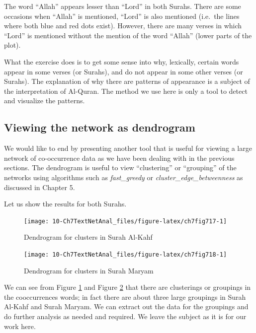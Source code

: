 \documentclass[
]{article}
\begin{document}
The word ``Allah'' appears lesser than ``Lord'' in both Surahs. There are some occasions when ``Allah'' is mentioned, ``Lord'' is also mentioned (i.e.~the lines where both blue and red dots exist). However, there are many verses in which ``Lord'' is mentioned without the mention of the word ``Allah'' (lower parts of the plot).

What the exercise does is to get some sense into why, lexically, certain words appear in some verses (or Surahs), and do not appear in some other verses (or Surahs). The explanation of why there are patterns of appearance is a subject of the interpretation of Al-Quran. The method we use here is only a tool to detect and visualize the patterns.

\hypertarget{viewing-the-network-as-dendrogram}{%
\subsection{Viewing the network as dendrogram}\label{viewing-the-network-as-dendrogram}}

We would like to end by presenting another tool that is useful for viewing a large network of co-occurrence data as we have been dealing with in the previous sections. The dendrogram is useful to view ``clustering'' or ``grouping'' of the networks using algorithms such as \emph{fast\_greedy} or \emph{cluster\_edge\_betweenness} as discussed in Chapter 5.

Let us show the results for both Surahs.

\begin{figure}

{\centering \texttt{[image: 10-Ch7TextNetAnal\_files/figure-latex/ch7fig717-1]} 

}

\caption{Dendrogram for clusters in Surah Al-Kahf}\label{fig:ch7fig717}
\end{figure}

\begin{figure}

{\centering \texttt{[image: 10-Ch7TextNetAnal\_files/figure-latex/ch7fig718-1]} 

}

\caption{Dendrogram for clusters in Surah Maryam}\label{fig:ch7fig718}
\end{figure}

We can see from Figure \ref{fig:ch7fig717} and Figure \ref{fig:ch7fig718} that there are clusterings or groupings in the cooccurrences words; in fact there are about three large groupings in Surah Al-Kahf and Surah Maryam. We can extract out the data for the groupings and do further analysis as needed and required. We leave the subject as it is for our work here.
\end{document}

